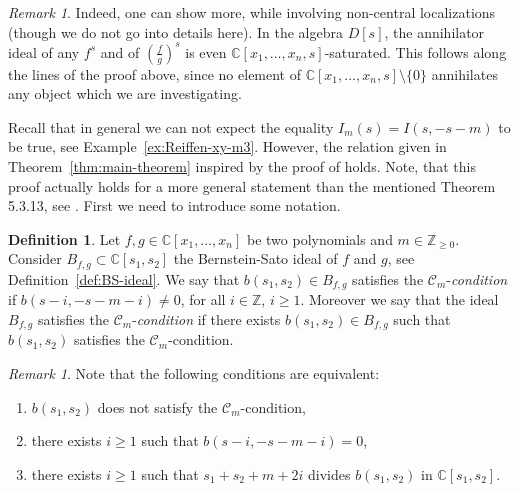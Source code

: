 \documentclass[a4paper,12pt]{amsart}
\theoremstyle{plain}
\theoremstyle{definition}
\newtheorem{defi}[theorem]{Definition}
\theoremstyle{remark}
\newtheorem{remark}[theorem]{Remark}
\def\CC{\mathbb{C}}
\def\ZZ{\mathbb{Z}}
\begin{document}
\begin{remark}
Indeed, one can show more, while involving non-central localizations (though we do not go into details here). In the algebra $D[s]$,
the annihilator ideal of any $f^s$ and of $\left(\frac{f}{g}\right)^s$ is even $\CC[x_1,\ldots,x_n,s]$-saturated. This follows along the lines of the proof above, since no element of $\CC[x_1,\ldots,x_n,s]\setminus\{0\}$ annihilates any object which we are investigating.
\end{remark}

Recall that in general we can not expect the equality $I_m(s) = I(s,-s-m)$ to be true, see Example~\ref{ex:Reiffen-xy-m3}.
However, the relation given in Theorem~\ref{thm:main-theorem} inspired by the proof of \cite[Theorem 5.3.13]{SST00} holds. Note, that this proof actually holds for a more general statement than the mentioned Theorem 5.3.13, see \cite{Oaku12}.
First we need to introduce some notation.

\begin{defi}\label{defi:C-condition}
Let $f,g \in \CC[x_1,\ldots,x_n]$ be two polynomials and $m \in \ZZ_{\geq 0}$.
Consider $B_{f,g} \subset \CC[s_1,s_2]$ the Bernstein-Sato ideal of $f$ and $g$, see Definition~\ref{def:BS-ideal}.
We say that $b(s_1,s_2) \in B_{f,g}$ satisfies the $\mathcal{C}_m$-\emph{condition} if
$b(s-i, -s-m-i) \neq 0$, for all $i \in \ZZ$, $i \geq 1$. Moreover we say that the ideal $B_{f,g}$ satisfies
the $\mathcal{C}_m$-\emph{condition} if there exists $b(s_1,s_2) \in B_{f,g}$ such that $b(s_1,s_2)$ satisfies
the $\mathcal{C}_m$-condition.
\end{defi}

\begin{remark}\label{rem:C-condition}
Note that the following conditions are equivalent:
\begin{enumerate}
\item $b(s_1,s_2)$ does not satisfy the $\mathcal{C}_m$-condition,
\item there exists $i \geq 1$ such that $b(s-i,-s-m-i) = 0$,
\item there exists $i \geq 1$ such that $s_1 + s_2 + m + 2i$ divides $b(s_1,s_2)$ in $\CC[s_1,s_2]$.
\end{enumerate}
\end{remark}
\end{document}
